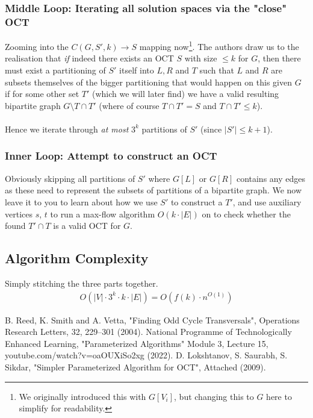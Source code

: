 \documentclass{article}
\begin{document}
\subsubsection{Middle Loop: Iterating all solution spaces via the "close" OCT}
Zooming into the $C(G, S', k) \rightarrow S$ mapping now\footnote{We originally introduced this with $G[V_i]$, but changing this to $G$ here to simplify for readability.}. The authors draw us to the realisation that {\em if} indeed there exists an OCT $S$ with size $\leq k$ for $G$, then there must exist a partitioning of $S'$ itself into $L, R$ and $T$ such that $L$ and $R$ are subsets themselves of the bigger partitioning that would happen on this given $G$ if for some other set $T'$ (which we will later find) we have a valid resulting bipartite graph $G \setminus T \cap T'$ (where of course $T \cap T' = S$ and $T \cap T' \leq k$).
\\~\\
Hence we iterate through {\em at most} $3^k$ partitions of $S'$ (since $|S'| \leq k + 1$).

\subsubsection{Inner Loop: Attempt to construct an OCT}
Obviously skipping all partitions of $S'$ where $G[L]$ or $G[R]$ contains any edges as these need to represent the subsets of partitions of a bipartite graph. We now leave it to you to learn about how we use $S'$ to construct a $T'$, and use auxiliary vertices $s$, $t$ to run a max-flow algorithm $O(k \cdot |E|)$ on to check whether the found $T' \cap T$ is a valid OCT for $G$.

\subsection{Algorithm Complexity}
Simply stitching the three parts together.
\begin{align*}
O(|V| \cdot 3^k \cdot k \cdot |E|) = O (f(k) \cdot n^{O(1)})
\end{align*}

\begin{thebibliography}{9}
B. Reed, K. Smith and A. Vetta, "Finding Odd Cycle Transversals", Operations Research Letters, 32, 229–301 (2004).
National Programme of Technologically Enhanced Learning, "Parameterized Algorithms" Module 3, Lecture 15, youtube.com/watch?v=oaOUXiSo2xg (2022).
D. Lokshtanov, S. Saurabh, S. Sikdar, "Simpler Parameterized Algorithm for OCT", Attached (2009).
\end{thebibliography}
\end{document}

